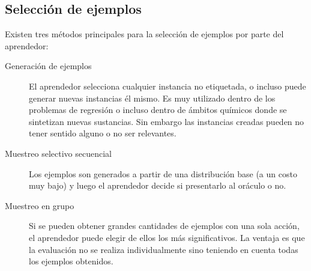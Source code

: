 \documentclass[11pt,spanish]{article}
\begin{document}
\subsection{Selección de ejemplos}
Existen tres métodos principales para la selección de ejemplos por parte del
aprendedor:
\begin{description}
    \item[Generación de ejemplos] El aprendedor selecciona cualquier instancia
    no etiquetada, o incluso puede generar nuevas instancias él mismo. Es muy
    utilizado dentro de los problemas de regresión o incluso dentro de ámbitos
    químicos donde se sintetizan nuevas sustancias. Sin embargo las instancias
    creadas pueden no tener sentido alguno o no ser relevantes.
    \item[Muestreo selectivo secuencial] Los ejemplos son generados a partir de
    una distribución base (a un costo muy bajo) y luego el aprendedor decide si
    presentarlo al oráculo o no.
    \item[Muestreo en grupo] Si se pueden obtener grandes cantidades de ejemplos
    con una sola acción, el aprendedor puede elegir de ellos los más
    significativos. La ventaja es que la evaluación no se realiza
    individualmente sino teniendo en cuenta todas los ejemplos obtenidos.
\end{description}
\end{document}
